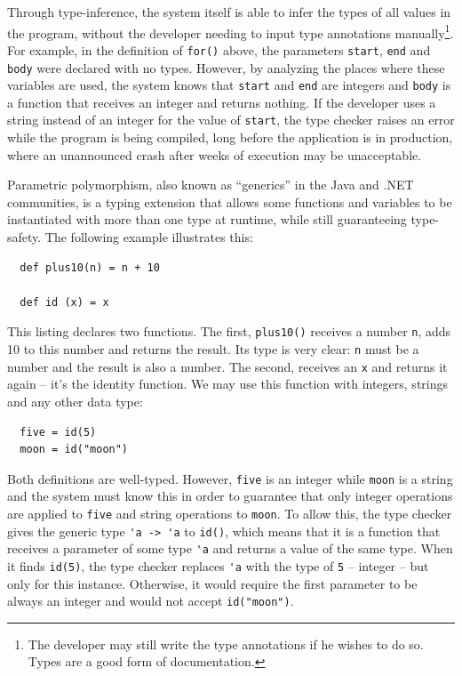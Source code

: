 Through type-inference, the system itself is able to infer the types
of all values in the program, without the developer needing to input
type annotations manually\footnote{The developer may still write the
  type annotations if he wishes to do so. Types are a good form of
  documentation.}. For example, in the definition of \verb=for()=
above, the parameters \verb=start=, \verb=end= and \verb=body= were
declared with no types. However, by analyzing the places where these
variables are used, the system knows that \verb=start= and \verb=end=
are integers and \verb=body= is a function that receives an integer
and returns nothing. If the developer uses a string instead of an
integer for the value of \verb=start=, the type checker raises an
error while the program is being compiled, long before the application
is in production, where an unannounced crash after weeks of execution
may be unacceptable.

Parametric polymorphism, also known as ``generics'' in the Java and
.NET communities, is a typing extension that allows some functions and
variables to be instantiated with more than one type at runtime, while
still guaranteeing type-safety. The following example illustrates
this:

\begin{lstlisting}
  def plus10(n) = n + 10

  def id (x) = x
\end{lstlisting}

This listing declares two functions. The first, \verb=plus10()=
receives a number \verb=n=, adds 10 to this number and returns the
result. Its type is very clear: \verb=n= must be a number and the
result is also a number. The second, receives an \verb=x= and returns
it again -- it's the identity function. We may use this function with
integers, strings and any other data type:

\begin{lstlisting}
  five = id(5)
  moon = id("moon")
\end{lstlisting}

Both definitions are well-typed. However, \verb=five= is an integer
while \verb=moon= is a string and the system must know this in order
to guarantee that only integer operations are applied to \verb=five=
and string operations to \verb=moon=. To allow this, the type checker
gives the generic type \verb='a -> 'a= to \verb=id()=, which means
that it is a function that receives a parameter of some type \verb='a=
and returns a value of the same type. When it finds \verb=id(5)=, the
type checker replaces \verb='a= with the type of \verb=5= -- integer
-- but only for this instance. Otherwise, it would require the first
parameter to be always an integer and would not accept
\verb=id("moon")=.

